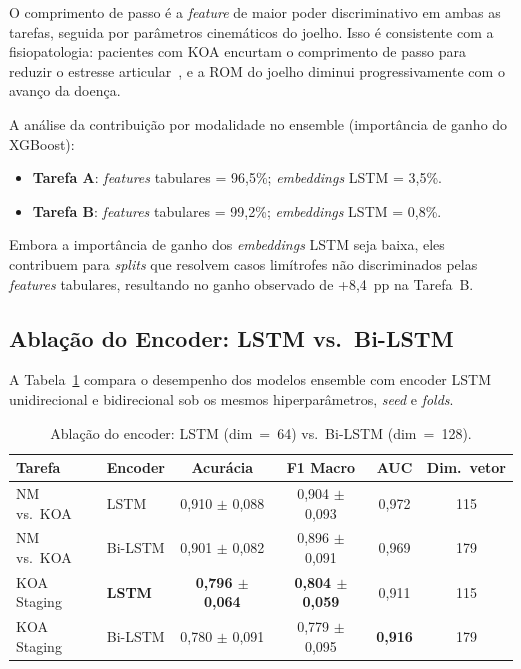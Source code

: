\documentclass[a4paper,12pt]{article}
\begin{document}
O comprimento de passo é a \textit{feature} de maior poder discriminativo em ambas
as tarefas, seguida por parâmetros cinemáticos do joelho. Isso é consistente com a
fisiopatologia: pacientes com KOA encurtam o comprimento de passo para reduzir o
estresse articular~\cite{Stenum2021}, e a ROM do joelho diminui progressivamente com
o avanço da doença.

A análise da contribuição por modalidade no ensemble (importância de ganho do
XGBoost):
\begin{itemize}
  \item \textbf{Tarefa A}: \textit{features} tabulares = 96,5\%;
        \textit{embeddings} LSTM = 3,5\%.
  \item \textbf{Tarefa B}: \textit{features} tabulares = 99,2\%;
        \textit{embeddings} LSTM = 0,8\%.
\end{itemize}

Embora a importância de ganho dos \textit{embeddings} LSTM seja baixa, eles
contribuem para \textit{splits} que resolvem casos limítrofes não discriminados pelas
\textit{features} tabulares, resultando no ganho observado de +8,4~pp na Tarefa~B.

\subsection{Ablação do Encoder: LSTM vs.\ Bi-LSTM}

A Tabela~\ref{tab:ablation} compara o desempenho dos modelos ensemble com encoder
LSTM unidirecional e bidirecional sob os mesmos hiperparâmetros, \textit{seed} e
\textit{folds}.

\begin{table}[H]
  \centering
  \caption{Ablação do encoder: LSTM (dim~=~64) vs.\ Bi-LSTM (dim~=~128).}
  \label{tab:ablation}
  \begin{tabular}{@{}llcccc@{}}
    \toprule
    \textbf{Tarefa} & \textbf{Encoder} &
    \textbf{Acurácia} & \textbf{F1 Macro} & \textbf{AUC} &
    \textbf{Dim.\ vetor} \\
    \midrule
    NM vs.\ KOA  & LSTM    & 0,910 $\pm$ 0,088 & 0,904 $\pm$ 0,093 & 0,972 & 115 \\
    NM vs.\ KOA  & Bi-LSTM & 0,901 $\pm$ 0,082 & 0,896 $\pm$ 0,091 & 0,969 & 179 \\
    KOA Staging  & \textbf{LSTM}
                 & \textbf{0,796 $\pm$ 0,064}
                 & \textbf{0,804 $\pm$ 0,059} & 0,911 & 115 \\
    KOA Staging  & Bi-LSTM & 0,780 $\pm$ 0,091 & 0,779 $\pm$ 0,095
                 & \textbf{0,916} & 179 \\
    \bottomrule
  \end{tabular}
\end{table}
\end{document}
